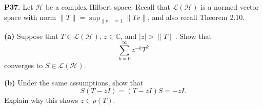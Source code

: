 \documentclass[12pt]{amsart}
\newcommand{\cH}{\mathcal{H}}
\newcommand{\cL}{\mathcal{L}}
\newcommand{\CC}{\mathbb{C}}
\newcommand{\prob}[1]{\bigskip\noindent\textbf{#1.}\quad }
\newcommand{\epart}[1]{\medskip\noindent\textbf{(#1)}\quad }
\begin{document}
\prob{P37}  Let $\cH$ be a complex Hilbert space.  Recall that $\cL(\cH)$ is a normed vector space with norm $\|T\| = \sup_{\|v\|=1} \|Tv\|$, and also recall Theorem 2.10.

\epart{a}  Suppose that $T\in\cL(\cH)$, $z\in\CC$, and $|z| > \|T\|$.  Show that
	$$\sum_{k=0}^\infty z^{-k} T^k$$
converges to $S \in \cL(\cH)$.

\epart{b}  Under the same assumptions, show that
	$$S (T-z I) = (T-z I) S = - z I.$$
Explain why this shows $z \in \rho(T)$.



\end{document}
